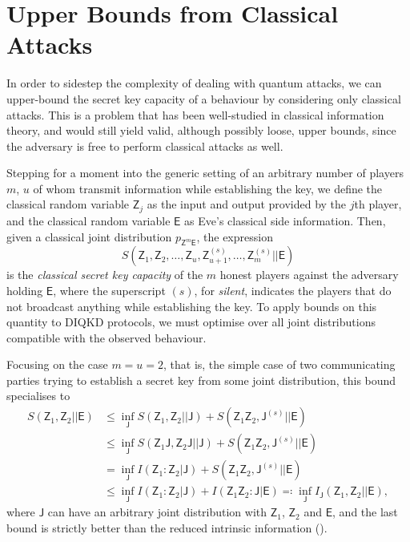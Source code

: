 \documentclass[10pt, a4paper]{article}
\numberwithin{equation}{section} %
\theoremstyle{definition}
\theoremstyle{plain}
\newcommand{\?}{\mathrel{?}} %
\newcommand{\cvec}[1]{\boldsymbol{\mathbf{#1}}}    %
\newcommand{\crv}[1]{\mathsf{#1}}
\begin{document}
    \section{Upper Bounds from Classical Attacks}

    In order to sidestep the complexity of dealing with quantum attacks, we can upper-bound the secret key capacity of a behaviour by considering only classical attacks. This is a problem that has been well-studied in classical information theory, and would still yield valid, although possibly loose, upper bounds, since the adversary is free to perform classical attacks as well.

    Stepping for a moment into the generic setting of an arbitrary number of players \(m\), \(u\) of whom transmit information while establishing the key, we define the classical random variable \(\crv{Z}_j\) as the input and output provided by the \(j\)th player, and the classical random variable \(\crv{E}\) as Eve's classical side information. Then, given a classical joint distribution \(p_{\cvec{\crv{Z}}^m\crv{E}}\), the expression
    \begin{equation}
      S(\crv{Z}_1, \crv{Z}_2, \ldots, \crv{Z}_{u}, \crv{Z}_{u+1}^{(s)}, \ldots, \crv{Z}_{m}^{(s)} || \crv{E})
    \end{equation}
    is the \emph{classical secret key capacity} of the \(m\) honest players against the adversary holding \(\crv{E}\), where the superscript \((s)\), for \emph{silent}, indicates the players that do not broadcast anything while establishing the key. To apply bounds on this quantity to DIQKD protocols, we must optimise over all joint distributions compatible with the observed behaviour.


    \newcommand{\splitkey}[3][\crv{J}]{I_{#1}\left(#2||#3\right)}

    Focusing on the case \(m = u = 2\), that is, the simple case of two communicating parties trying to establish a secret key from some joint distribution, this bound specialises to
    \begin{align}
      S(\crv{Z}_1, \crv{Z}_2||\crv{E}) &\leq \inf_\crv{J} S(\crv{Z}_1, \crv{Z}_2||\crv{J}) + S(\crv{Z}_1\crv{Z}_2, \crv{J}^{(s)}||\crv{E}) \\
                     &\leq \inf_\crv{J} S(\crv{Z}_1\crv{J}, \crv{Z}_2\crv{J}||\crv{J}) + S(\crv{Z}_1\crv{Z}_2, \crv{J}^{(s)}||\crv{E}) \\
                     &= \inf_\crv{J} I(\crv{Z}_1 : \crv{Z}_2|\crv{J}) + S(\crv{Z}_1\crv{Z}_2, \crv{J}^{(s)}||\crv{E}) \\
                     &\leq \inf_\crv{J} I(\crv{Z}_1 : \crv{Z}_2|\crv{J}) + I(\crv{Z}_1\crv{Z}_2 : \crv{J}|\crv{E}) \eqqcolon \inf_{\crv{J}} \splitkey{\crv{Z}_1,\crv{Z}_2}{\crv{E}},
    \end{align}
    where \(\crv{J}\) can have an arbitrary joint distribution with \(\crv{Z}_1\), \(\crv{Z}_2\) and \(\crv{E}\), and the last bound is strictly better than the reduced intrinsic information ().
\end{document}
